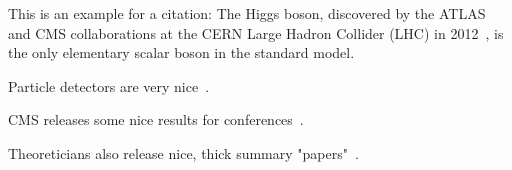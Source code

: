 \label{sec:theory}

This is an example for a citation:
The Higgs boson, discovered by the ATLAS and CMS collaborations at the CERN Large Hadron Collider (LHC) in 2012~\cite{ATLAS:2012yve,CMS:2012qbp}, is the only elementary scalar boson in the standard model.

Particle detectors are very nice~\cite{Kolanoski:2016gyf}.


CMS releases some nice results for conferences~\cite{CMS-PAS-SMP-22-009}.

Theoreticians also release nice, thick summary "papers"~\cite{LHCHiggsCrossSectionWorkingGroup:2016ypw}.